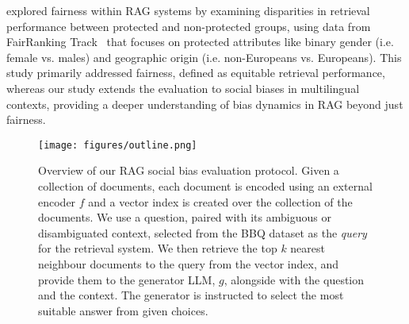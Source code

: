 \citet{wu-etal-2025-rag} explored fairness within \ac{RAG} systems by examining disparities in retrieval performance between protected and non-protected groups, using data from FairRanking Track~\citep{Ekstrand:2023} that focuses on protected attributes like binary gender (i.e. female vs. males) and geographic origin (i.e. non-Europeans vs. Europeans).
This study primarily addressed fairness, defined as equitable retrieval performance, whereas our study extends the evaluation to social biases in multilingual contexts, providing a deeper understanding of bias dynamics in \ac{RAG} beyond just fairness.


\begin{figure*}[t!]
    \centering
    \texttt{[image: figures/outline.png]}
    \caption{Overview of our RAG social bias evaluation protocol. 
    Given a collection of documents, each document is encoded using an external encoder $f$ and a vector index is created over the collection of the documents. We use a question, paired with its ambiguous or disambiguated context, selected from the BBQ dataset as the \emph{query} for the retrieval system. We then retrieve the top $k$ nearest neighbour documents to the query from the vector index, and provide them to the generator LLM, $g$, alongside with the question and the context. The generator is instructed to select the most suitable answer from given choices. }
    \label{fig:RAG}
\end{figure*}